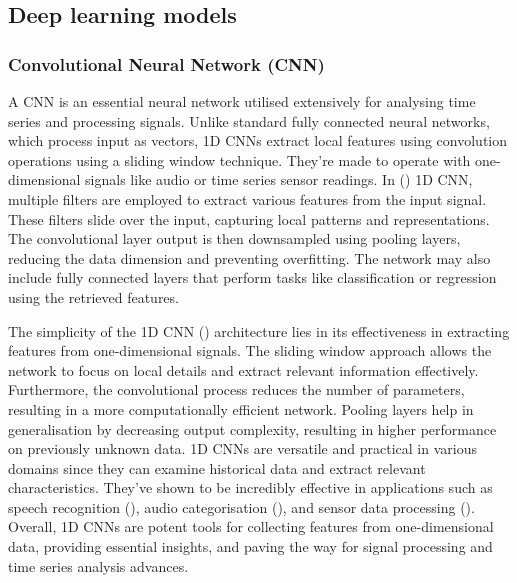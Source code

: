 \documentclass[a4paper, fleqn]{cas-sc}
\theoremstyle{definition}
\theoremstyle{remark}
\begin{document}
\subsection{Deep learning models}
\subsubsection{Convolutional Neural Network (CNN)}
A CNN is an essential neural network utilised extensively for analysing time series and processing signals. Unlike standard fully connected neural networks,  which process input as vectors,  1D CNNs extract local features using convolution operations using a sliding window technique. They're made to operate with one-dimensional signals like audio or time series sensor readings. In  (\cite{chaerun2021comparative}) 1D CNN,  multiple filters are employed to extract various features from the input signal. These filters slide over the input,  capturing local patterns and representations. The convolutional layer output is then downsampled using pooling layers,  reducing the data dimension and preventing overfitting. The network may also include fully connected layers that perform tasks like classification or regression using the retrieved features.

The simplicity of the 1D CNN (\cite{kiranyaz20211d}) architecture lies in its effectiveness in extracting features from one-dimensional signals. The sliding window approach allows the network to focus on local details and extract relevant information effectively. Furthermore,  the convolutional process reduces the number of parameters,  resulting in a more computationally efficient network. Pooling layers help in generalisation by decreasing output complexity,  resulting in higher performance on previously unknown data. 1D CNNs are versatile and practical in various domains since they can examine historical data and extract relevant characteristics. They've shown to be incredibly effective in applications such as speech recognition (\cite{rusnac2022cnn, wang2019end}),  audio categorisation (\cite{ashraf2022role, hu2020device}),  and sensor data processing (\cite{kattenborn2021review, sun2019classification}). Overall,  1D CNNs are potent tools for collecting features from one-dimensional data,  providing essential insights,  and paving the way for signal processing and time series analysis advances.
\end{document}
